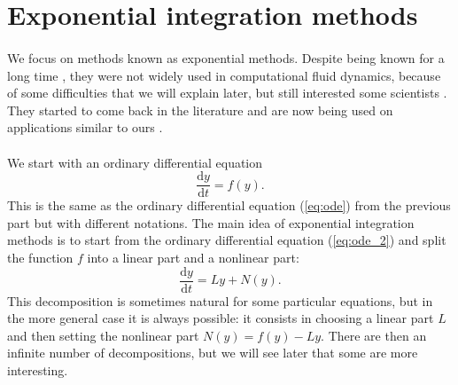   \section{Exponential integration methods}

    \paragraph{}
    We focus on methods known as exponential methods.
    Despite being known for a long time \cite{Pope1963}, they were not widely used in computational fluid dynamics, because of some difficulties that we will explain later, but still interested some scientists \cite{EdwardsTuckermanFriesnerEtAl1994}.
    They started to come back in the literature \cite{HochbruckOstermann2005, HochbruckOstermann2010} and are now being used on applications similar to ours \cite{NieZhangZhao2006, BhattKhaliqWade2018}.

    \paragraph{}
    We start with an ordinary differential equation
    \begin{equation}\label{eq:ode_2}
      \frac{\mathrm{d} y}{\mathrm{d} t} = f\left(y\right) .
    \end{equation}
    This is the same as the ordinary differential equation (\ref{eq:ode}) from the previous part but with different notations.
    The main idea of exponential integration methods is to start from the ordinary differential equation (\ref{eq:ode_2}) and split the function $f$ into a linear part and a nonlinear part:
    \begin{equation}\label{eq:ode_split}
      \frac{\mathrm{d} y}{\mathrm{d} t} = Ly + N\left(y\right) .
    \end{equation}
    This decomposition is sometimes natural for some particular equations, but in the more general case it is always possible: it consists in choosing a linear part $L$ and then setting the nonlinear part $N\left(y\right) = f(y) - Ly$.
    There are then an infinite number of decompositions, but we will see later that some are more interesting.


